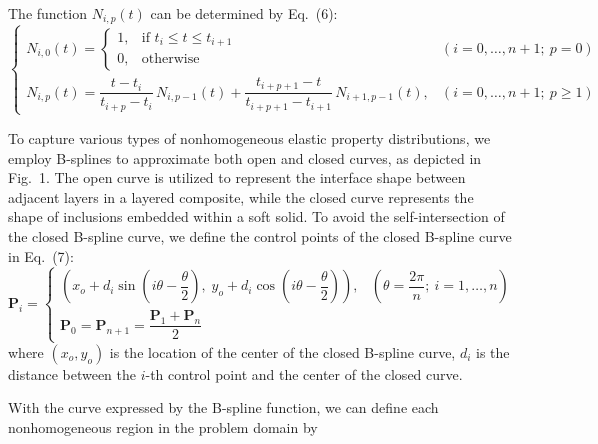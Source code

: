 \documentclass[11pt]{article}
\begin{document}
The function $N_{i,p}(t)$ can be determined by Eq.~(6):
\begin{equation}
\begin{cases}
N_{i,0}(t) =
\begin{cases}
1, & \text{if } t_i \leq t \leq t_{i+1} \\
0, & \text{otherwise}
\end{cases}
& (i = 0, \ldots, n+1;\ p = 0) \\[3.5ex]
N_{i,p}(t) = \dfrac{t - t_i}{t_{i+p} - t_i}\,N_{i,p-1}(t)
+ \dfrac{t_{i+p+1} - t}{t_{i+p+1} - t_{i+1}}\,N_{i+1,p-1}(t),
& (i = 0, \ldots, n+1;\ p \geq 1)
\end{cases}
\end{equation}

To capture various types of nonhomogeneous elastic property
distributions, we employ B-splines to approximate both open and
closed curves, as depicted in Fig.~1. The open curve is utilized to
represent the interface shape between adjacent layers in a layered
composite, while the closed curve represents the shape of inclusions
embedded within a soft solid. To avoid the self-intersection of the
closed B-spline curve, we define the control points of the closed
B-spline curve in Eq.~(7):
\begin{equation}
\mathbf{P}_i =
\begin{cases}
\left(
x_o + d_i \sin\!\left(i\theta - \dfrac{\theta}{2}\right),\;
y_o + d_i \cos\!\left(i\theta - \dfrac{\theta}{2}\right)
\right),
& \left(\theta = \dfrac{2\pi}{n};\ i = 1, \ldots, n\right) \\[3ex]
\mathbf{P}_0 = \mathbf{P}_{n+1} = \dfrac{\mathbf{P}_1 + \mathbf{P}_n}{2}
\end{cases}
\end{equation}
where $(x_o, y_o)$ is the location of the center of the closed
B-spline curve, $d_i$ is the distance between the $i$-th control
point and the center of the closed curve.

With the curve expressed by the B-spline function, we can define
each nonhomogeneous region in the problem domain by
\end{document}
